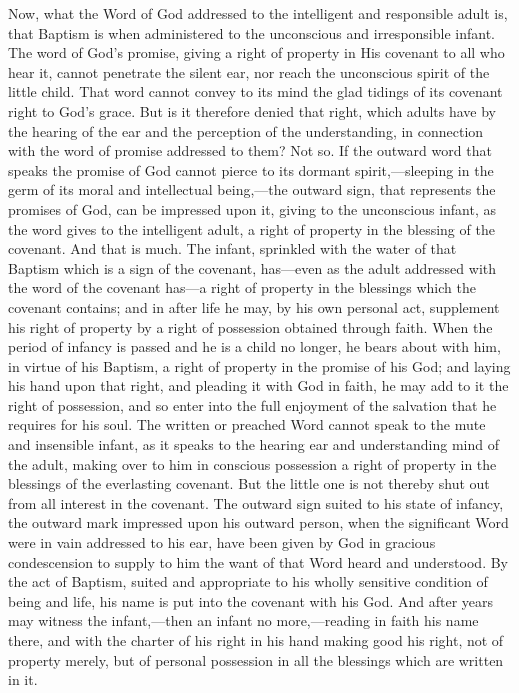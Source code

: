 \documentclass[
]{book}
\begin{document}
Now, what the Word of God addressed to the intelligent and responsible adult is, that Baptism is when administered to the unconscious and irresponsible infant. The word of God's promise, giving a right of property in His covenant to all who hear it, cannot penetrate the silent ear, nor reach the unconscious spirit of the little child. That word cannot convey to its mind the glad tidings of its covenant right to God's grace. But is it therefore denied that right, which adults have by the hearing of the ear and the perception of the understanding, in connection with the word of promise addressed to them? Not so. If the outward word that speaks the promise of God cannot pierce to its dormant spirit,---sleeping in the germ of its moral and intellectual being,---the outward sign, that represents the promises of God, can be impressed upon it, giving to the unconscious infant, as the word gives to the intelligent adult, a right of property in the blessing of the covenant. And that is much. The infant, sprinkled with the water of that Baptism which is a sign of the covenant, has---even as the adult addressed with the word of the covenant has---a right of property in the blessings which the covenant contains; and in after life he may, by his own personal act, supplement his right of property by a right of possession obtained through faith. When the period of infancy is passed and he is a child no longer, he bears about with him, in virtue of his Baptism, a right of property in the promise of his God; and laying his hand upon that right, and pleading it with God in faith, he may add to it the right of possession, and so enter into the full enjoyment of the salvation that he requires for his soul. The written or preached Word cannot speak to the mute and insensible infant, as it speaks to the hearing ear and understanding mind of the adult, making over to him in conscious possession a right of property in the blessings of the everlasting covenant. But the little one is not thereby shut out from all interest in the covenant. The outward sign suited to his state of infancy, the outward mark impressed upon his outward person, when the significant Word were in vain addressed to his ear, have been given by God in gracious condescension to supply to him the want of that Word heard and understood. By the act of Baptism, suited and appropriate to his wholly sensitive condition of being and life, his name is put into the covenant with his God. And after years may witness the infant,---then an infant no more,---reading in faith his name there, and with the charter of his right in his hand making good his right, not of property merely, but of personal possession in all the blessings which are written in it.
\end{document}
